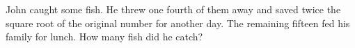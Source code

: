 John caught some fish. He threw one fourth of them away and saved twice the square root of the original number for another day. The remaining fifteen fed his family for lunch. How many fish did he catch?
